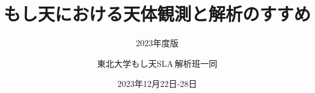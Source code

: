 \documentclass[twoside,openright,a4paper,papersize,uplatex,10pt,dvipdfmx]{jsbook}
\title{もし天における天体観測と解析のすすめ}
\subtitle{2023年度版}
\date{2023年12月22日-28日}
\author{東北大学もし天SLA\,解析班一同}
\begin{document}
\frontmatter
\maketitle

\thispagestyle{empty}
\setcounter{tocdepth}{1}
\tableofcontents
\listoffigures
\listoftables

\mainmatter









\renewcommand{\bibname}{参考文献}


\label{page:bib}


\end{document}
